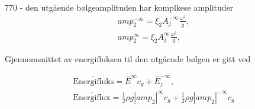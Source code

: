 770 - den utgående bølgeamplituden har komplkese amplituder
\begin{align}
	amp_2^{-\infty} = \xi_2 A_j^{- \infty} \frac{\omega^2}{g}, \\
	amp_2^{\infty} = \xi_2 A_j^{ \infty} \frac{\omega^2}{g},
\end{align}

Gjennomsnittet av energifluksen til den utgående bølgen er gitt ved

\begin{align}
	\overline{\text{Energifluks}} = \bar{E}^{\infty}c_g + \bar{E}_j^{-\infty},\\
	\overline{\text{Energiflux}} = \frac{1}{2}\rho g {|amp_2|}^{\infty}c_g + \frac{1}{2}\rho g {|amp_2|}^{-\infty}c_g
\end{align}

